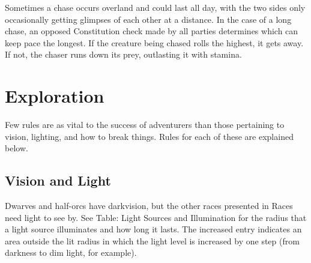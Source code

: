 Sometimes a chase occurs overland and could last all day, with the two sides only occasionally getting glimpses of each other at a distance. In the case of a long chase, an opposed Constitution check made by all parties determines which can keep pace the longest. If the creature being chased rolls the highest, it gets away. If not, the chaser runs down its prey, outlasting it with stamina.
				
\section{Exploration}

				
Few rules are as vital to the success of adventurers than those pertaining to vision, lighting, and how to break things. Rules for each of these are explained below.
				
\subsection{Vision and Light}

				
Dwarves and half-orcs have darkvision, but the other races presented in Races need light to see by. See Table: Light Sources and Illumination for the radius that a light source illuminates and how long it lasts. The increased entry indicates an area outside the lit radius in which the light level is increased by one step (from darkness to dim light, for example).

